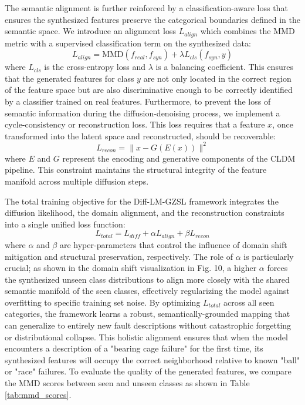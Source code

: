 The semantic alignment is further reinforced by a classification-aware loss that ensures the synthesized features preserve the categorical boundaries defined in the semantic space. We introduce an alignment loss $L_{align}$ which combines the MMD metric with a supervised classification term on the synthesized data:
\begin{equation}
L_{align} = \text{MMD}(f_{real}, f_{syn}) + \lambda L_{cls}(f_{syn}, y)
\end{equation}
where $L_{cls}$ is the cross-entropy loss and $\lambda$ is a balancing coefficient. This ensures that the generated features for class $y$ are not only located in the correct region of the feature space but are also discriminative enough to be correctly identified by a classifier trained on real features. Furthermore, to prevent the loss of semantic information during the diffusion-denoising process, we implement a cycle-consistency or reconstruction loss. This loss requires that a feature $x$, once transformed into the latent space and reconstructed, should be recoverable:
\begin{equation}
L_{recon} = \|x - G(E(x))\|^2
\end{equation}
where $E$ and $G$ represent the encoding and generative components of the CLDM pipeline. This constraint maintains the structural integrity of the feature manifold across multiple diffusion steps.

The total training objective for the Diff-LM-GZSL framework integrates the diffusion likelihood, the domain alignment, and the reconstruction constraints into a single unified loss function:
\begin{equation}
L_{total} = L_{diff} + \alpha L_{align} + \beta L_{recon}
\end{equation}
where $\alpha$ and $\beta$ are hyper-parameters that control the influence of domain shift mitigation and structural preservation, respectively. The role of $\alpha$ is particularly crucial; as shown in the domain shift visualization in Fig. 10, a higher $\alpha$ forces the synthesized unseen class distributions to align more closely with the shared semantic manifold of the seen classes, effectively regularizing the model against overfitting to specific training set noise. By optimizing $L_{total}$ across all seen categories, the framework learns a robust, semantically-grounded mapping that can generalize to entirely new fault descriptions without catastrophic forgetting or distributional collapse. This holistic alignment ensures that when the model encounters a description of a "bearing cage failure" for the first time, its synthesized features will occupy the correct neighborhood relative to known "ball" or "race" failures. To evaluate the quality of the generated features, we compare the MMD scores between seen and unseen classes as shown in Table \ref{tab:mmd_scores}.

